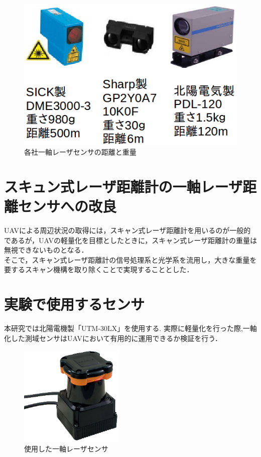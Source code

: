 \documentclass[12pt,oneside]{sotsuken_paper}
\begin{document}
\begin{figure}[H]
\begin{center}
\includegraphics[width=120mm]{img/ichizikure-za.png}
\end{center}
\caption{各社一軸レーザセンサの距離と重量}
\label{fig:re-za2}
\end{figure}


\section{スキュン式レーザ距離計の一軸レーザ距離センサへの改良}
UAVによる周辺状況の取得には，スキャン式レーザ距離計を用いるのが一般的であるが，UAVの軽量化を目標としたときに，スキャン式レーザ距離計の重量は無視できないものとなる．\\
そこで，スキャン式レーザ距離計の信号処理系と光学系を流用し，大きな重量を要するスキャン機構を取り除くことで実現することとした．

\section{実験で使用するセンサ}
本研究では北陽電機製「UTM-30LX」を使用する.
実際に軽量化を行った際,一軸化した測域センサはUAVにおいて有用的に運用できるか検証を行う．

\begin{figure}[H]
\begin{center}
\includegraphics[width=50mm]{img/2.png}
\end{center}
\caption{使用した一軸レーザセンサ}
\label{fig:2}
\end{figure}
\end{document}
